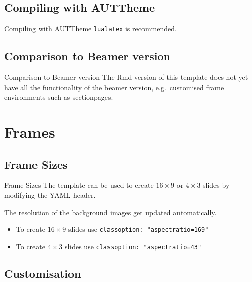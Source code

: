 \documentclass[
  ignorenonframetext,
  aspectratio=169]{beamer}
\providecommand{\tightlist}{%
  \setlength{\itemsep}{0pt}\setlength{\parskip}{0pt}}
\begin{document}
\hypertarget{compiling-with-auttheme}{%
\subsection{Compiling with AUTTheme}\label{compiling-with-auttheme}}

\begin{frame}[fragile]{Compiling with AUTTheme}
\texttt{lualatex} is recommended.
\end{frame}

\hypertarget{comparison-to-beamer-version}{%
\subsection{Comparison to Beamer
version}\label{comparison-to-beamer-version}}

\begin{frame}{Comparison to Beamer version}
The Rmd version of this template does not yet have all the functionality
of the beamer version, e.g.~customised frame environments such as
sectionpages.
\end{frame}

\hypertarget{frames}{%
\section{Frames}\label{frames}}

\hypertarget{frame-sizes}{%
\subsection{Frame Sizes}\label{frame-sizes}}

\begin{frame}[fragile]{Frame Sizes}
The template can be used to create \(16\times9\) or \(4 \times 3\)
slides by modifying the YAML header.

The resolution of the background images get updated automatically.

\begin{itemize}
\tightlist
\item
  To create \(16 \times 9\) slides use
  \texttt{classoption:\ "aspectratio=169"}
\item
  To create \(4 \times 3\) slides use
  \texttt{classoption:\ "aspectratio=43"}
\end{itemize}
\end{frame}

\hypertarget{customisation}{%
\subsection{Customisation}\label{customisation}}
\end{document}
